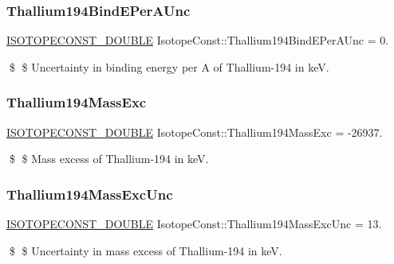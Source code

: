 \subsubsection{\texorpdfstring{Thallium194\+Bind\+E\+Per\+A\+Unc}{Thallium194BindEPerAUnc}}
{\footnotesize\ttfamily \mbox{\hyperlink{group___isotope_const-_macros_ga8f45a7272ce02c0b4c65c44636ed719a}{I\+S\+O\+T\+O\+P\+E\+C\+O\+N\+S\+T\+\_\+\+D\+O\+U\+B\+LE}} Isotope\+Const\+::\+Thallium194\+Bind\+E\+Per\+A\+Unc = 0.}

\$ \$ Uncertainty in binding energy per A of Thallium-\/194 in keV. \mbox{\label{group___isotope_const-_thallium-_tl194_ga6fbea5944bfec317a227a56132a3c159}} 
\subsubsection{\texorpdfstring{Thallium194\+Mass\+Exc}{Thallium194MassExc}}
{\footnotesize\ttfamily \mbox{\hyperlink{group___isotope_const-_macros_ga8f45a7272ce02c0b4c65c44636ed719a}{I\+S\+O\+T\+O\+P\+E\+C\+O\+N\+S\+T\+\_\+\+D\+O\+U\+B\+LE}} Isotope\+Const\+::\+Thallium194\+Mass\+Exc = -\/26937.}

\$ \$ Mass excess of Thallium-\/194 in keV. \mbox{\label{group___isotope_const-_thallium-_tl194_gaf07c3aed11e538c2bd3bb103d38e0723}} 
\subsubsection{\texorpdfstring{Thallium194\+Mass\+Exc\+Unc}{Thallium194MassExcUnc}}
{\footnotesize\ttfamily \mbox{\hyperlink{group___isotope_const-_macros_ga8f45a7272ce02c0b4c65c44636ed719a}{I\+S\+O\+T\+O\+P\+E\+C\+O\+N\+S\+T\+\_\+\+D\+O\+U\+B\+LE}} Isotope\+Const\+::\+Thallium194\+Mass\+Exc\+Unc = 13.}

\$ \$ Uncertainty in mass excess of Thallium-\/194 in keV. \mbox{\label{group___isotope_const-_thallium-_tl194_gab42f81c098eee35769674c9b6d60cc40}} 
